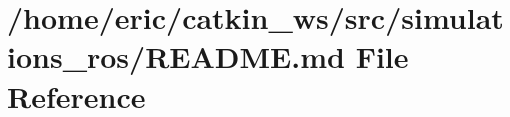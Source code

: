 \hypertarget{simulations__ros_2README_8md}{}\section{/home/eric/catkin\+\_\+ws/src/simulations\+\_\+ros/\+R\+E\+A\+D\+ME.md File Reference}
\label{simulations__ros_2README_8md}
